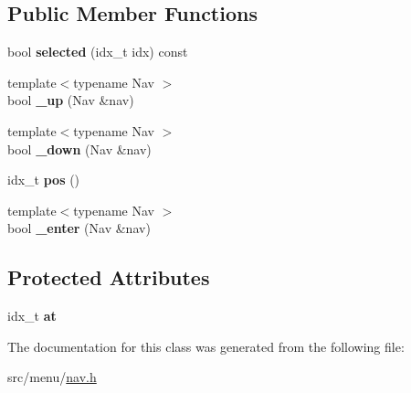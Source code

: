 \subsection*{Public Member Functions}
\begin{DoxyCompactItemize}
\item 
\mbox{\label{classNavPos_a5791336166c6b6e636091fcf1d9f1a94}} 
bool {\bfseries selected} (idx\+\_\+t idx) const
\item 
\mbox{\label{classNavPos_a0ae21ba323346cf4c5cf949e73e0113c}} 
{\footnotesize template$<$typename Nav $>$ }\\bool {\bfseries \+\_\+up} (Nav \&nav)
\item 
\mbox{\label{classNavPos_ab9bc8381292843c78ebc06dc3b381dd6}} 
{\footnotesize template$<$typename Nav $>$ }\\bool {\bfseries \+\_\+down} (Nav \&nav)
\item 
\mbox{\label{classNavPos_a8a4323652335e34fbd88232076bf17f2}} 
idx\+\_\+t {\bfseries pos} ()
\item 
\mbox{\label{classNavPos_ae6e5322b840088108dc0d3aa38a9acf4}} 
{\footnotesize template$<$typename Nav $>$ }\\bool {\bfseries \+\_\+enter} (Nav \&nav)
\end{DoxyCompactItemize}
\subsection*{Protected Attributes}
\begin{DoxyCompactItemize}
\item 
\mbox{\label{classNavPos_a65e603f9f19b2c0edc010ee54c2e96f0}} 
idx\+\_\+t {\bfseries at}
\end{DoxyCompactItemize}


The documentation for this class was generated from the following file\+:\begin{DoxyCompactItemize}
\item 
src/menu/\hyperlink{nav_8h}{nav.\+h}\end{DoxyCompactItemize}
